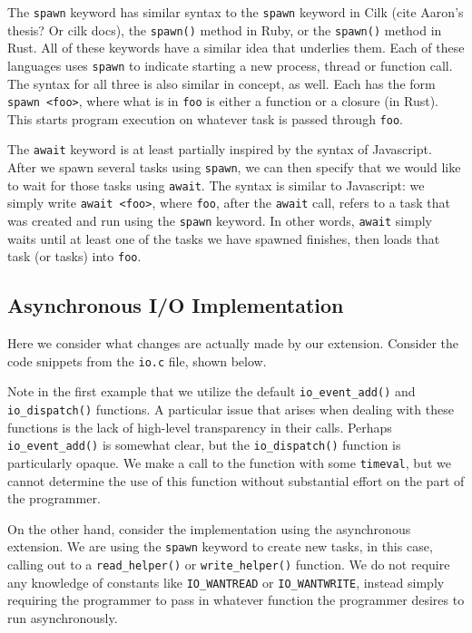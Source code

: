 \documentclass[main.tex]{subfiles}
\begin{document}
The \verb|spawn| keyword has similar syntax to the \verb|spawn| keyword in Cilk (cite Aaron's thesis? Or cilk docs),
the \verb|spawn()| method in Ruby, or the \verb|spawn()| method in Rust. All of these keywords have a similar idea
that underlies them. Each of these languages uses \verb|spawn| to indicate starting a new process, thread or function call.
The syntax for all three is also similar in concept, as well. Each has the form \verb|spawn <foo>|, where what is in 
\verb|foo| is either a function or a closure (in Rust). This starts program execution on whatever task is passed through 
\verb|foo|.

The \verb|await| keyword is at least partially inspired by the syntax of Javascript. After we spawn several tasks using
\verb|spawn|, we can then specify that we would like to wait for those tasks using \verb|await|. The syntax is similar to
Javascript: we simply write \verb|await <foo>|, where \verb|foo|, after the \verb|await| call, refers to a task that was created and
run using the \verb|spawn| keyword. In other words, \verb|await| simply waits until at least one of the tasks we have spawned
finishes, then loads that task (or tasks) into \verb|foo|.

\subsection{Asynchronous I/O Implementation}
Here we consider what changes are actually made by our extension. Consider the code snippets from the \verb|io.c| file, shown below.

Note in the first example that we utilize the default \verb|io_event_add()| and \verb|io_dispatch()| functions. A particular
issue that arises when dealing with these functions is the lack of high-level transparency in their calls. Perhaps 
\verb|io_event_add()| is somewhat clear, but the \verb|io_dispatch()| function is particularly opaque. We make a call to the
function with some \verb|timeval|, but we cannot determine the use of this function without substantial effort on the part of the
programmer. 

On the other hand, consider the implementation using the asynchronous extension. We are using the
\verb|spawn| keyword to create new tasks, in this case, calling out to a \verb|read_helper()| or \verb|write_helper()| function.
We do not require any knowledge of constants like \verb|IO_WANTREAD| or \verb|IO_WANTWRITE|, instead simply requiring
the programmer to pass in whatever function the programmer desires to run asynchronously. 
\end{document}
